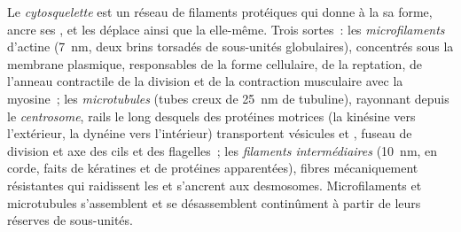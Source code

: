 \begin{definition}[Cytosquelette]\label{def:b1:eukaryotic-cell:cytoskeleton}
Le \emph{cytosquelette} est un réseau de filaments
protéiques qui donne à la  sa forme, ancre ses , et les
déplace ainsi que la  elle-même. Trois sortes~: les
\emph{microfilaments} d'actine (\qty{7}{nm}, deux
brins torsadés de sous-unités globulaires), concentrés sous la membrane
plasmique, responsables de la forme cellulaire, de la reptation, de
l'anneau contractile de la division et de la contraction musculaire avec
la myosine~; les \emph{microtubules} (tubes creux de
\qty{25}{nm} de tubuline), rayonnant depuis le
\emph{centrosome}, rails le long desquels des
protéines motrices (la kinésine vers l'extérieur, la dynéine vers
l'intérieur) transportent vésicules et , fuseau de division et
axe des cils et des flagelles~; les \emph{filaments
intermédiaires} (\qty{10}{nm}, en corde,
faits de kératines et de protéines apparentées), fibres mécaniquement
résistantes qui raidissent les  et s'ancrent aux desmosomes.
Microfilaments et microtubules s'assemblent et se désassemblent
continûment à partir de leurs réserves de sous-unités.
\end{definition}

